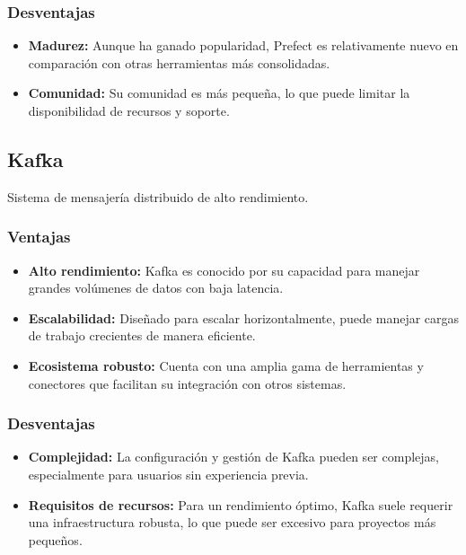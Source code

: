 \subsubsection{Desventajas}
\begin{itemize}
    \item \textbf{Madurez:} Aunque ha ganado popularidad, Prefect es relativamente nuevo en comparación con otras herramientas más consolidadas.
    
    \item \textbf{Comunidad:} Su comunidad es más pequeña, lo que puede limitar la disponibilidad de recursos y soporte.
\end{itemize}

\subsection{Kafka}
Sistema de mensajería distribuido de alto rendimiento.

\subsubsection{Ventajas}
\begin{itemize}
    \item \textbf{Alto rendimiento:} Kafka es conocido por su capacidad para manejar grandes volúmenes de datos con baja latencia.
    
    \item \textbf{Escalabilidad:} Diseñado para escalar horizontalmente, puede manejar cargas de trabajo crecientes de manera eficiente.
    
    \item \textbf{Ecosistema robusto:} Cuenta con una amplia gama de herramientas y conectores que facilitan su integración con otros sistemas.
\end{itemize}

\subsubsection{Desventajas}
\begin{itemize}
    \item \textbf{Complejidad:} La configuración y gestión de Kafka pueden ser complejas, especialmente para usuarios sin experiencia previa.
    
    \item \textbf{Requisitos de recursos:} Para un rendimiento óptimo, Kafka suele requerir una infraestructura robusta, lo que puede ser excesivo para proyectos más pequeños.
\end{itemize}

